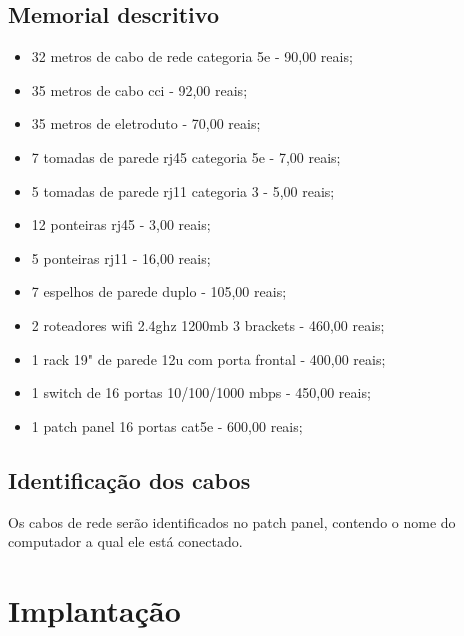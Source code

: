 \documentclass[	DIV=calc,%
							paper=a4,%
							fontsize=12pt,%
							onecolumn]{scrartcl}	 					%
\begin{document}
\subsection{Memorial descritivo}
\begin{itemize}

\item 32 metros de cabo de rede categoria 5e - 90,00 reais;

\item 35 metros de cabo cci - 92,00 reais;

\item 35 metros de eletroduto - 70,00 reais;

\item 7 tomadas de parede rj45 categoria 5e - 7,00 reais;

\item 5 tomadas de parede rj11 categoria 3 -  5,00 reais;

\item 12 ponteiras rj45 - 3,00 reais;

\item 5 ponteiras rj11 - 16,00 reais;

\item 7 espelhos de parede duplo - 105,00 reais;

\item 2 roteadores wifi 2.4ghz 1200mb 3 brackets - 460,00 reais;

\item 1 rack 19" de parede 12u com porta frontal - 400,00 reais;

\item 1 switch de 16 portas 10/100/1000 mbps - 450,00 reais;

\item 1 patch panel 16 portas cat5e - 600,00 reais;

\end{itemize} 

\subsection{Identificação dos cabos}

Os cabos de rede serão identificados no patch panel, contendo o nome do computador a qual ele está conectado.

\section{Implantação}
\end{document}
